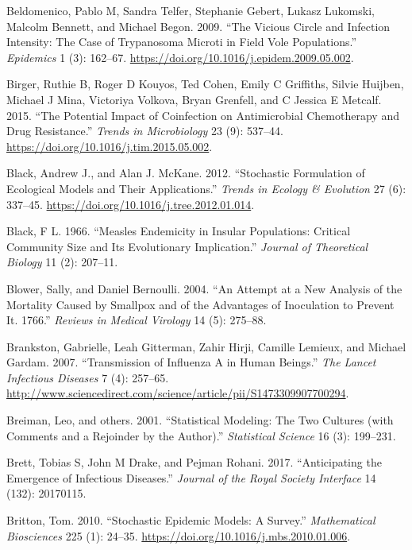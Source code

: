 \documentclass[
]{book}
\begin{document}
\leavevmode\hypertarget{ref-beldomenico09}{}%
Beldomenico, Pablo M, Sandra Telfer, Stephanie Gebert, Lukasz Lukomski, Malcolm Bennett, and Michael Begon. 2009. ``The Vicious Circle and Infection Intensity: The Case of Trypanosoma Microti in Field Vole Populations.'' \emph{Epidemics} 1 (3): 162--67. \url{https://doi.org/10.1016/j.epidem.2009.05.002}.

\leavevmode\hypertarget{ref-birger15}{}%
Birger, Ruthie B, Roger D Kouyos, Ted Cohen, Emily C Griffiths, Silvie Huijben, Michael J Mina, Victoriya Volkova, Bryan Grenfell, and C Jessica E Metcalf. 2015. ``The Potential Impact of Coinfection on Antimicrobial Chemotherapy and Drug Resistance.'' \emph{Trends in Microbiology} 23 (9): 537--44. \url{https://doi.org/10.1016/j.tim.2015.05.002}.

\leavevmode\hypertarget{ref-black12}{}%
Black, Andrew J., and Alan J. McKane. 2012. ``Stochastic Formulation of Ecological Models and Their Applications.'' \emph{Trends in Ecology \& Evolution} 27 (6): 337--45. \url{https://doi.org/10.1016/j.tree.2012.01.014}.

\leavevmode\hypertarget{ref-black66}{}%
Black, F L. 1966. ``Measles Endemicity in Insular Populations: Critical Community Size and Its Evolutionary Implication.'' \emph{Journal of Theoretical Biology} 11 (2): 207--11.

\leavevmode\hypertarget{ref-blower04}{}%
Blower, Sally, and Daniel Bernoulli. 2004. ``An Attempt at a New Analysis of the Mortality Caused by Smallpox and of the Advantages of Inoculation to Prevent It. 1766.'' \emph{Reviews in Medical Virology} 14 (5): 275--88.

\leavevmode\hypertarget{ref-brankston07}{}%
Brankston, Gabrielle, Leah Gitterman, Zahir Hirji, Camille Lemieux, and Michael Gardam. 2007. ``Transmission of Influenza A in Human Beings.'' \emph{The Lancet Infectious Diseases} 7 (4): 257--65. \url{http://www.sciencedirect.com/science/article/pii/S1473309907700294}.

\leavevmode\hypertarget{ref-breiman01}{}%
Breiman, Leo, and others. 2001. ``Statistical Modeling: The Two Cultures (with Comments and a Rejoinder by the Author).'' \emph{Statistical Science} 16 (3): 199--231.

\leavevmode\hypertarget{ref-brett17}{}%
Brett, Tobias S, John M Drake, and Pejman Rohani. 2017. ``Anticipating the Emergence of Infectious Diseases.'' \emph{Journal of the Royal Society Interface} 14 (132): 20170115.

\leavevmode\hypertarget{ref-britton10a}{}%
Britton, Tom. 2010. ``Stochastic Epidemic Models: A Survey.'' \emph{Mathematical Biosciences} 225 (1): 24--35. \url{https://doi.org/10.1016/j.mbs.2010.01.006}.
\end{document}

